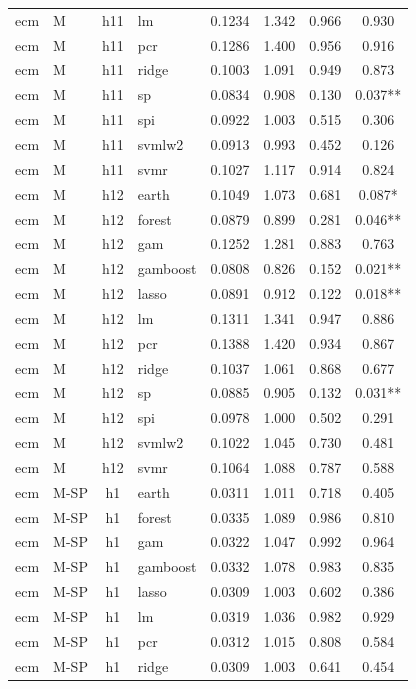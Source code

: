 \begin{ThreePartTable}
\begin{longtable}[t]{llclcccc}
ecm & M & h11 & lm & 0.1234 & 1.342 & 0.966 & 0.930\\
ecm & M & h11 & pcr & 0.1286 & 1.400 & 0.956 & 0.916\\
ecm & M & h11 & ridge & 0.1003 & 1.091 & 0.949 & 0.873\\
ecm & M & h11 & sp & 0.0834 & 0.908 & 0.130 & 0.037**\\
ecm & M & h11 & spi & 0.0922 & 1.003 & 0.515 & 0.306\\
ecm & M & h11 & svmlw2 & 0.0913 & 0.993 & 0.452 & 0.126\\
ecm & M & h11 & svmr & 0.1027 & 1.117 & 0.914 & 0.824\\
\addlinespace
ecm & M & h12 & earth & 0.1049 & 1.073 & 0.681 & 0.087*\\
ecm & M & h12 & forest & 0.0879 & 0.899 & 0.281 & 0.046**\\
ecm & M & h12 & gam & 0.1252 & 1.281 & 0.883 & 0.763\\
ecm & M & h12 & gamboost & 0.0808 & 0.826 & 0.152 & 0.021**\\
ecm & M & h12 & lasso & 0.0891 & 0.912 & 0.122 & 0.018**\\
ecm & M & h12 & lm & 0.1311 & 1.341 & 0.947 & 0.886\\
ecm & M & h12 & pcr & 0.1388 & 1.420 & 0.934 & 0.867\\
ecm & M & h12 & ridge & 0.1037 & 1.061 & 0.868 & 0.677\\
ecm & M & h12 & sp & 0.0885 & 0.905 & 0.132 & 0.031**\\
ecm & M & h12 & spi & 0.0978 & 1.000 & 0.502 & 0.291\\
ecm & M & h12 & svmlw2 & 0.1022 & 1.045 & 0.730 & 0.481\\
ecm & M & h12 & svmr & 0.1064 & 1.088 & 0.787 & 0.588\\
\addlinespace
ecm & M-SP & h1 & earth & 0.0311 & 1.011 & 0.718 & 0.405\\
ecm & M-SP & h1 & forest & 0.0335 & 1.089 & 0.986 & 0.810\\
ecm & M-SP & h1 & gam & 0.0322 & 1.047 & 0.992 & 0.964\\
ecm & M-SP & h1 & gamboost & 0.0332 & 1.078 & 0.983 & 0.835\\
ecm & M-SP & h1 & lasso & 0.0309 & 1.003 & 0.602 & 0.386\\
ecm & M-SP & h1 & lm & 0.0319 & 1.036 & 0.982 & 0.929\\
ecm & M-SP & h1 & pcr & 0.0312 & 1.015 & 0.808 & 0.584\\
ecm & M-SP & h1 & ridge & 0.0309 & 1.003 & 0.641 & 0.454\\

\end{longtable}
\end{ThreePartTable}
